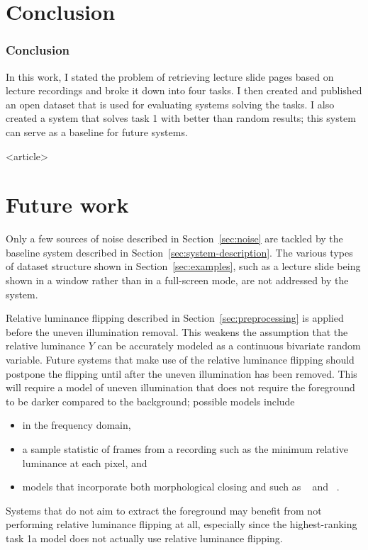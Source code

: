 \section{Conclusion}
\label{sec:conclusion}
\begin{frame}
\frametitle<presentation>{Conclusion}
In this work, I stated the problem of retrieving lecture slide pages based on
lecture recordings and broke it down into four tasks. I then created and
published an open dataset that is used for evaluating systems solving the
tasks. I also created a system that solves task 1 with better than random
results; this system can serve as a baseline for future systems.
\end{frame}

\mode
<article>

\section{Future work}
\label{sec:future-work}
Only a few sources of noise described in Section~\ref{sec:noise} are tackled by
the baseline system described in Section~\ref{sec:system-description}. The
various types of dataset structure shown in Section~\ref{sec:examples}, such as
a lecture slide being shown in a window rather than in a full-screen mode, are
not addressed by the system.

Relative luminance flipping described in Section~\ref{sec:preprocessing} is
applied before the uneven illumination removal. This weakens the assumption that
the relative luminance $Y$ can be accurately modeled as a continuous bivariate
random variable. Future systems that make use of the relative luminance
flipping should postpone the flipping until after the uneven illumination has
been removed. This will require a model of uneven illumination that does not
require the foreground to be darker compared to the background; possible models
include
\begin{itemize}
  \item {} in the frequency domain,
  \item a sample statistic of frames from a recording such as the minimum
    relative luminance at each pixel, and
  \item models that incorporate both morphological closing and
     such as
    ~\cite[sec.~8.5]{soille2013morphological} and
    ~\cite[sec.~8.2.2]{soille2013morphological}.
\end{itemize}
Systems that do not aim to extract the foreground may benefit from not
performing relative luminance flipping at all, especially since the
highest-ranking task 1a model does not actually use relative luminance flipping.

